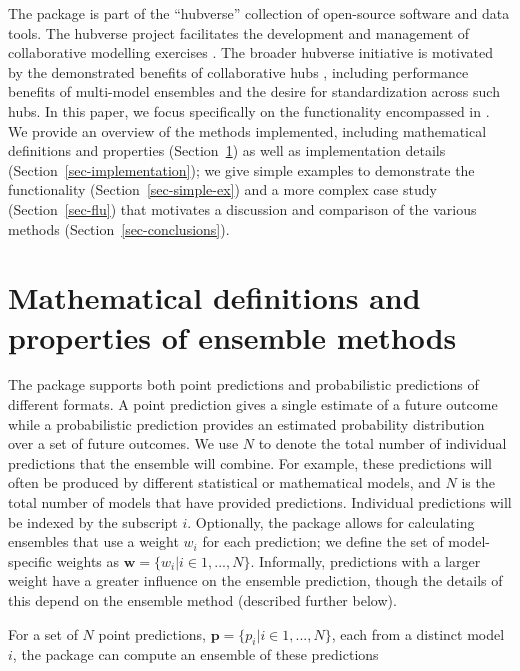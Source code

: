 \documentclass[
  article,
  shortnames,
  notitle]{jss}
\begin{document}
The  package is part of the ``hubverse'' collection of
open-source software and data tools. The hubverse project facilitates
the development and management of collaborative modelling exercises
\citep{hubverse_docs}. The broader hubverse initiative is motivated by
the demonstrated benefits of collaborative hubs
\citep{reich2022, borchering_public_2023}, including performance
benefits of multi-model ensembles and the desire for standardization
across such hubs. In this paper, we focus specifically on the
functionality encompassed in . We provide an overview
of the methods implemented, including mathematical definitions and
properties (Section~\ref{sec-defs}) as well as implementation details
(Section~\ref{sec-implementation}); we give simple examples to
demonstrate the functionality (Section~\ref{sec-simple-ex}) and a more
complex case study (Section~\ref{sec-flu}) that motivates a discussion
and comparison of the various methods (Section~\ref{sec-conclusions}).

\section{Mathematical definitions and properties of ensemble
methods}\label{sec-defs}

The  package supports both point predictions and
probabilistic predictions of different formats. A point prediction gives
a single estimate of a future outcome while a probabilistic prediction
provides an estimated probability distribution over a set of future
outcomes. We use \(N\) to denote the total number of individual
predictions that the ensemble will combine. For example, these
predictions will often be produced by different statistical or
mathematical models, and \(N\) is the total number of models that have
provided predictions. Individual predictions will be indexed by the
subscript \(i\). Optionally, the package allows for calculating
ensembles that use a weight \(w_i\) for each prediction; we define the
set of model-specific weights as
\(\pmb{w} = \{w_i | i \in 1, ..., N\}\). Informally, predictions with a
larger weight have a greater influence on the ensemble prediction,
though the details of this depend on the ensemble method (described
further below).

For a set of \(N\) point predictions,
\(\pmb{p} = \{p_i|i \in 1, ..., N\}\), each from a distinct model \(i\),
the  package can compute an ensemble of these
predictions
\end{document}
